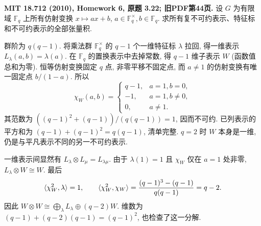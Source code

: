 \begin{exercise}\label{hw:3.22}
\textbf{MIT 18.712 (2010), Homework 6, 原题 3.22; 旧PDF第44页.}
设 $G$ 为有限域 $\mathbb F_q$ 上所有仿射变换 $x\mapsto ax+b$, $a\in\mathbb F_q^\times,b\in\mathbb F_q$. 求所有复不可约表示、特征标和不可约表示的全部张量积.
\end{exercise}
\begin{solution}
群阶为 $q(q-1)$. 将乘法群 $\mathbb F_q^\times$ 的 $q-1$ 个一维特征标 $\lambda$ 拉回, 得一维表示 $L_\lambda(a,b)=\lambda(a)$. 在 $\mathbb F_q$ 的置换表示中去掉常数, 得 $q-1$ 维子表示 $W$ (函数值总和为零). 恒等仿射变换固定 $q$ 点, 非零平移不固定点, 而 $a\ne1$ 的仿射变换有唯一固定点 $b/(1-a)$. 所以
\[
 \chi_W(a,b)=\begin{cases}q-1,&a=1,b=0,\\-1,&a=1,b\ne0,\\0,&a\ne1.\end{cases}
\]
其范数为 $((q-1)^2+(q-1))/(q(q-1))=1$, 因而不可约. 已列表示的平方和为 $(q-1)+(q-1)^2=q(q-1)$, 清单完整. $q=2$ 时 $W$ 本身是一维, 仍是与平凡表示不同的另一不可约表示.

一维表示间显然有 $L_\lambda\otimes L_\mu=L_{\lambda\mu}$. 由于 $\lambda(1)=1$ 且 $\chi_W$ 仅在 $a=1$ 处非零, $L_\lambda\otimes W\cong W$. 最后
\[
 \langle \chi_W^2,\lambda\rangle=1,\qquad
 \langle \chi_W^2,\chi_W\rangle
 =\frac{(q-1)^3-(q-1)}{q(q-1)}=q-2.
\]
因此 $W\otimes W\cong\bigoplus_\lambda L_\lambda\oplus(q-2)W$. 维数为 $(q-1)+(q-2)(q-1)=(q-1)^2$, 也检查了这一分解.
\end{solution}

